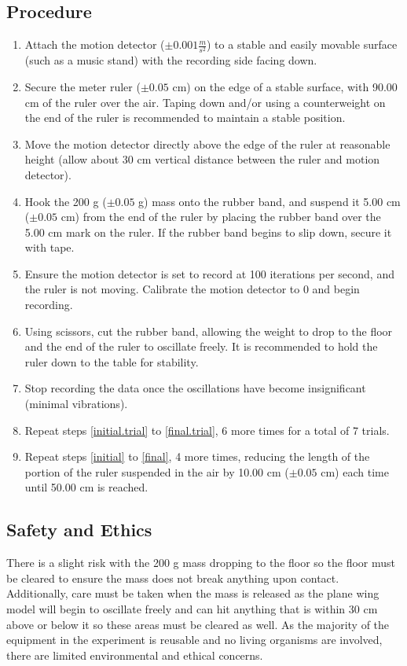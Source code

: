 \documentclass[12pt]{article}
\begin{document}
\subsection{Procedure}
\begin{enumerate}
    \item Attach the motion detector ($\pm 0.001 \frac{m}{s^2}$) to a stable and easily movable surface (such as a music stand) with the recording side facing down. 
    \item\label{initial} Secure the meter ruler ($\pm 0.05$ cm) on the edge of a stable surface, with 90.00 cm of the ruler over the air. Taping down and/or using a counterweight on the end of the ruler is recommended to maintain a stable position. 
    \item Move the motion detector directly above the edge of the ruler at reasonable height (allow about 30 cm vertical distance between the ruler and motion detector).
    \item\label{initial.trial} Hook the 200 g ($\pm0.05$ g) mass onto the rubber band, and suspend it 5.00 cm ($\pm 0.05$ cm) from the end of the ruler by placing the rubber band over the 5.00 cm mark on the ruler. If the rubber band begins to slip down, secure it with tape. 
    \item Ensure the motion detector is set to record at 100 iterations per second, and the ruler is not moving. Calibrate the motion detector to 0 and begin recording.
    \item Using scissors, cut the rubber band, allowing the weight to drop to the floor and the end of the ruler to oscillate freely. It is recommended to hold the ruler down to the table for stability.
    \item\label{final.trial} Stop recording the data once the oscillations have become insignificant (minimal vibrations).
    \item\label{final} Repeat steps \ref{initial.trial} to \ref{final.trial}, 6 more times for a total of 7 trials.
    \item Repeat steps \ref{initial} to \ref{final}, 4 more times, reducing the length of the portion of the ruler suspended in the air by 10.00 cm ($\pm 0.05$ cm) each time until 50.00 cm is reached.
\end{enumerate}

\subsection{Safety and Ethics}
There is a slight risk with the 200 g mass dropping to the floor so the floor must be cleared to ensure the mass does not break anything upon contact. Additionally, care must be taken when the mass is released as the plane wing model will begin to oscillate freely and can hit anything that is within 30 cm above or below it so these areas must be cleared as well. As the majority of the equipment in the experiment is reusable and no living organisms are involved, there are limited environmental and ethical concerns.
\end{document}
